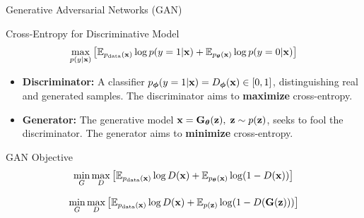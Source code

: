 \documentclass{beamer}
\renewcommand{\eqpause}{}
\begin{document}
\begin{frame}{Generative Adversarial Networks (GAN)}
	\begin{block}{Cross-Entropy for Discriminative Model}
		\vspace{-0.3cm}
		\[
			\max_{p(y | \mathbf{x})} \left[\mathbb{E}_{p_{\text{data}}(\mathbf{x})} \log p(y = 1 | \mathbf{x}) + \mathbb{E}_{p_{\boldsymbol{\theta}}(\mathbf{x})} \log p(y = 0 | \mathbf{x}) \right] 
		\]
	\end{block}
	\eqpause
	\begin{itemize}
		\item \textbf{Discriminator:} A classifier $p_{\boldsymbol{\phi}}(y = 1 | \mathbf{x}) = D_{\boldsymbol{\phi}}(\mathbf{x}) \in [0, 1]$, distinguishing real and generated samples. The discriminator aims to \textbf{maximize} cross-entropy.
		\item \textbf{Generator:} The generative model $\mathbf{x} = \mathbf{G}_{\boldsymbol{\theta}}(\mathbf{z}),\; \mathbf{z} \sim p(\mathbf{z})$, seeks to fool the discriminator. The generator aims to \textbf{minimize} cross-entropy.
	\end{itemize}
	\eqpause
	\begin{block}{GAN Objective}
		\vspace{-0.5cm}
		\[
			\min_{G} \max_D \left[ \mathbb{E}_{p_{\text{data}}(\mathbf{x})} \log D(\mathbf{x}) + \mathbb{E}_{p_{\boldsymbol{\theta}}(\mathbf{x})} \log (1 - D(\mathbf{x})) \right] 
		\]
		\eqpause
		\[
			\min_{G} \max_D \left[ \mathbb{E}_{p_{\text{data}}(\mathbf{x})} \log D(\mathbf{x}) + \mathbb{E}_{p(\mathbf{z})} \log (1 - D(\mathbf{G}(\mathbf{z}))) \right]
		\]
	\end{block}
\end{frame}
\end{document}

